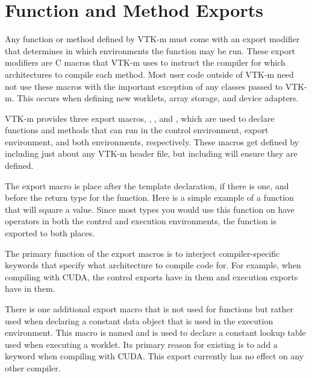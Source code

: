

\section{Function and Method Exports}
\label{sec:FunctionAndMethodExports}

Any function or method defined by VTK-m must come with an export modifier
that determines in which environments the function may be run. These export
modifiers are C macros that VTK-m uses to instruct the compiler for which
architectures to compile each method. Most user code outside of VTK-m need
not use these macros with the important exception of any classes passed to
VTK-m. This occurs when defining new worklets, array storage, and device
adapters.

VTK-m provides three export macros, \vtkmcontexport, \vtkmexecexport, and
\vtkmexeccontexport, which are used to declare functions and methods that
can run in the control environment, export environment, and both
environments, respectively. These macros get defined by including just
about any VTK-m header file, but including  will
ensure they are defined. 

The export macro is place after the template declaration, if there is one,
and before the return type for the function. Here is a simple example of a
function that will square a value. Since most types you would use this
function on have operators in both the control and execution environments,
the function is exported to both places.


The primary function of the export macros is to interject compiler-specific
keywords that specify what architecture to compile code for. For example,
when compiling with CUDA, the control exports have
 in them and execution exports have
 in them.

There is one additional export macro that is not used for functions but
rather used when declaring a constant data object that is used in the
execution environment. This macro is named
and is used to declare a constant lookup table used when executing a
worklet. Its primary reason for existing is to add a
 keyword when compiling with CUDA. This export
currently has no effect on any other compiler.


